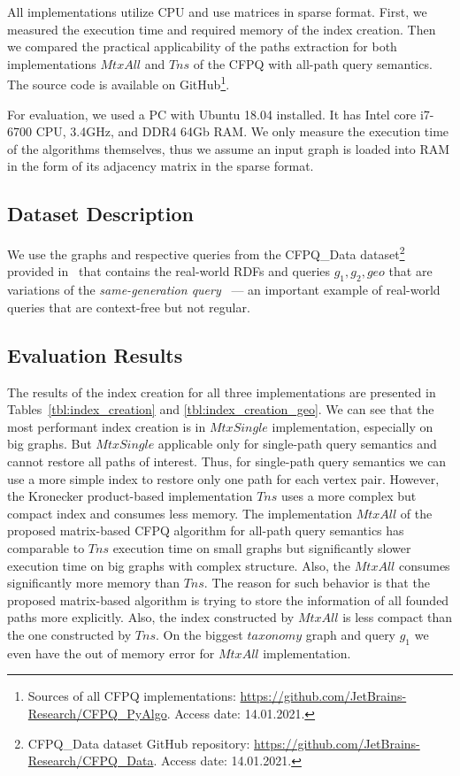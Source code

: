 All implementations utilize CPU and use matrices in sparse format. First, we measured the execution time and required memory of the index creation. Then we compared the practical applicability of the paths extraction for both implementations $MtxAll$ and $Tns$ of the CFPQ with all-path query semantics. The source code is available on GitHub\footnote{Sources of all CFPQ implementations: \url{https://github.com/JetBrains-Research/CFPQ\_PyAlgo}. Access date: 14.01.2021.}.

For evaluation, we used a PC with Ubuntu 18.04 installed.
It has Intel core i7-6700 CPU, 3.4GHz, and DDR4 64Gb RAM.
We only measure the execution time of the algorithms themselves, thus we assume an input graph is loaded into RAM in the form of its adjacency matrix in the sparse format.

\subsection{Dataset Description}

We use the graphs and respective queries from the CFPQ\_Data dataset\footnote{CFPQ\_Data dataset GitHub repository: \url{https://github.com/JetBrains-Research/CFPQ_Data}. Access date: 14.01.2021.} provided in~\cite{10.1145/3398682.3399163} that contains the real-world RDFs and queries $g_1, g_2, geo$ 
that are variations of the \textit{same-generation query}~\cite{FndDB} --- an important example of real-world queries that are context-free but not regular.




\subsection{Evaluation Results}
The results of the index creation for all three implementations are presented in Tables~\ref{tbl:index_creation} and \ref{tbl:index_creation_geo}. We can see that the most performant index creation is in $MtxSingle$ implementation, especially on big graphs. But $MtxSingle$ applicable only for single-path query semantics  and cannot restore all paths of interest. Thus, for single-path query semantics we can use a more simple index to restore only one path for each vertex pair. However, the Kronecker product-based implementation $Tns$ uses a more complex but compact index and consumes less memory. The implementation $MtxAll$ of the proposed matrix-based CFPQ algorithm for all-path query semantics has comparable to $Tns$ execution time on small graphs but significantly slower execution time on big graphs with complex structure. Also, the $MtxAll$ 
consumes significantly more memory than $Tns$. The reason for such behavior is that the proposed matrix-based algorithm is trying to store the information of all founded paths more explicitly. Also, the index constructed by $MtxAll$ is less compact than the one constructed by $Tns$. On the biggest $taxonomy$ graph and query $g_1$ we even have the out of memory error for $MtxAll$ implementation.

